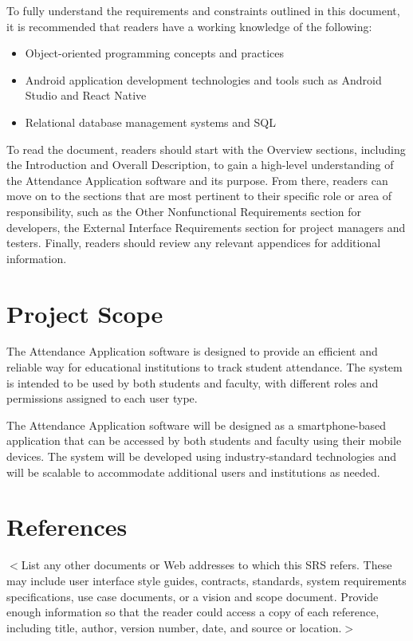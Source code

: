 \documentclass{scrreprt}
\begin{document}
    \vspace*{-7pt}
To fully understand the requirements and constraints outlined in this document, it is recommended that readers have a working knowledge of the following:
    \vspace*{-7pt}

\begin{itemize}
    \item Object-oriented programming concepts and practices
    \vspace*{-7pt}
    \item Android application development technologies and tools such as Android Studio and React Native
    \vspace*{-7pt}
    \item Relational database management systems and SQL
\end{itemize}

To read the document, readers should start with the Overview sections, including the Introduction and Overall Description,
 to gain a high-level understanding of the Attendance Application software and its purpose. From there, readers can move on to the sections 
 that are most pertinent to their specific role or area of responsibility, such as the Other Nonfunctional Requirements section for developers,
  the External Interface Requirements section for project managers and testers. Finally, readers should review any relevant appendices for additional information.

\section{Project Scope}
The Attendance Application software is designed to provide an efficient and reliable way for educational institutions to track student attendance. The system is intended to be used by both students and faculty, with different roles and permissions assigned to each user type.

The Attendance Application software will be designed as a smartphone-based application that can be accessed by both students and faculty using their mobile devices. The system will be developed using industry-standard technologies and will be scalable to accommodate additional users and institutions as needed.

\section{References}
$<$List any other documents or Web addresses to which this SRS refers. These may 
include user interface style guides, contracts, standards, system requirements 
specifications, use case documents, or a vision and scope document. Provide 
enough information so that the reader could access a copy of each reference, 
including title, author, version number, date, and source or location.$>$
\end{document}
